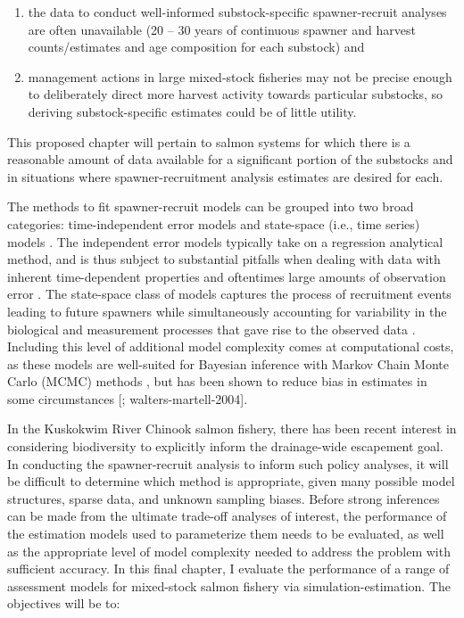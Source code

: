 \documentclass[12pt,]{book}
\theoremstyle{definition}
\theoremstyle{definition}
\theoremstyle{definition}
\theoremstyle{remark}
\begin{document}
\begin{enumerate}
\def\labelenumi{(\arabic{enumi})}
\item
  the data to conduct well-informed substock-specific spawner-recruit
  analyses are often unavailable (20 -- 30 years of continuous spawner
  and harvest counts/estimates and age composition for each substock)
  and
\item
  management actions in large mixed-stock fisheries may not be precise
  enough to deliberately direct more harvest activity towards particular
  substocks, so deriving substock-specific estimates could be of little
  utility.
\end{enumerate}

\noindent
This proposed chapter will pertain to salmon systems for which there is
a reasonable amount of data available for a significant portion of the
substocks and in situations where spawner-recruitment analysis estimates
are desired for each.

The methods to fit spawner-recruit models can be grouped into two broad
categories: time-independent error models
\citep[i.e.,][]{clark-etal-2009} and state-space (i.e., time series)
models \citep{fleischman-etal-2013, su-peterman-2012}. The independent
error models typically take on a regression analytical method, and is
thus subject to substantial pitfalls when dealing with data with
inherent time-dependent properties and oftentimes large amounts of
observation error \citep{walters-martell-2004}. The state-space class of
models captures the process of recruitment events leading to future
spawners while simultaneously accounting for variability in the
biological and measurement processes that gave rise to the observed data
\citep{devalpine-hastings-2002, fleischman-etal-2013}. Including this
level of additional model complexity comes at computational costs, as
these models are well-suited for Bayesian inference with Markov Chain
Monte Carlo (MCMC) methods \citep[Ch. 4]{newman-etal-2014}, but has been
shown to reduce bias in estimates in some circumstances
{[}\citet{su-peterman-2012}; walters-martell-2004{]}.

In the Kuskokwim River Chinook salmon fishery, there has been recent
interest in considering biodiversity to explicitly inform the
drainage-wide escapement goal. In conducting the spawner-recruit
analysis to inform such policy analyses, it will be difficult to
determine which method is appropriate, given many possible model
structures, sparse data, and unknown sampling biases. Before strong
inferences can be made from the ultimate trade-off analyses of interest,
the performance of the estimation models used to parameterize them needs
to be evaluated, as well as the appropriate level of model complexity
needed to address the problem with sufficient accuracy. In this final
chapter, I evaluate the performance of a range of assessment models for
mixed-stock salmon fishery via simulation-estimation. The objectives
will be to:
\end{document}
